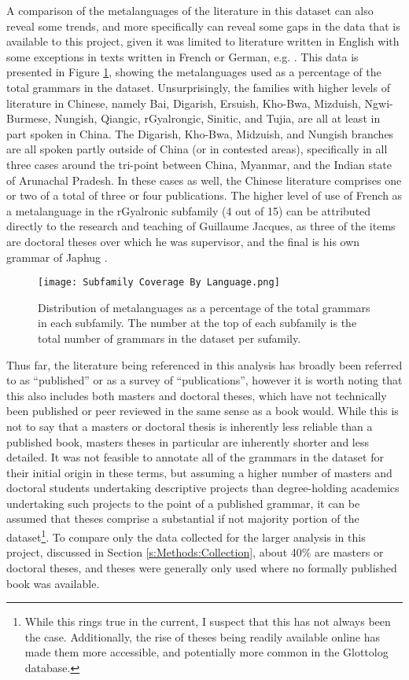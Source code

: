 A comparison of the metalanguages of the literature in this dataset can also reveal some trends, and more specifically can reveal some gaps in the data that is available to this project, given it was limited to literature written in English with some exceptions in texts written in French or German, e.g. . This data is presented in Figure \ref{f:Description:SubfamilyCoverageByLanguage}, showing the metalanguages used as a percentage of the total grammars in the dataset. Unsurprisingly, the families with higher levels of literature in Chinese, namely Bai, Digarish, Ersuish, Kho-Bwa, Mizduish, Ngwi-Burmese, Nungish, Qiangic, rGyalrongic, Sinitic, and Tujia, are all at least in part spoken in China. The Digarish, Kho-Bwa, Midzuish, and Nungish branches are all spoken partly outside of China (or in contested areas), specifically in all three cases around the tri-point between China, Myanmar, and the Indian state of Arunachal Pradesh. In these cases as well, the Chinese literature comprises one or two of a total of three or four publications. The higher level of use of French as a metalanguage in the rGyalronic subfamily (4 out of 15) can be attributed directly to the research and teaching of Guillaume Jacques, as three of the items are doctoral theses over which he was supervisor, and the final is his own grammar of Japhug \cite{Jacques2021}.

\begin{figure}
        \texttt{[image: Subfamily Coverage By Language.png]}
        \caption{Distribution of metalanguages as a percentage of the total grammars in each subfamily. The number at the top of each subfamily is the total number of grammars in the dataset per sufamily.}\label{f:Description:SubfamilyCoverageByLanguage}
\end{figure}

Thus far, the literature being referenced in this analysis has broadly been referred to as ``published'' or as a survey of ``publications'', however it is worth noting that this also includes both masters and doctoral theses, which have not technically been published or peer reviewed in the same sense as a book would. While this is not to say that a masters or doctoral thesis is inherently less reliable than a published book, masters theses in particular are inherently shorter and less detailed. It was not feasible to annotate all of the grammars in the dataset for their initial origin in these terms, but assuming a higher number of masters and doctoral students undertaking descriptive projects than degree-holding academics undertaking such projects to the point of a published grammar, it can be assumed that theses comprise a substantial if not majority portion of the dataset\footnote{While this rings true in the current, I suspect that this has not always been the case. Additionally, the rise of theses being readily available online has made them more accessible, and potentially more common in the Glottolog database.}. To compare only the data collected for the larger analysis in this project, discussed in Section \ref{s:Methods:Collection}, about 40\% are masters or doctoral theses, and theses were generally only used where no formally published book was available.

